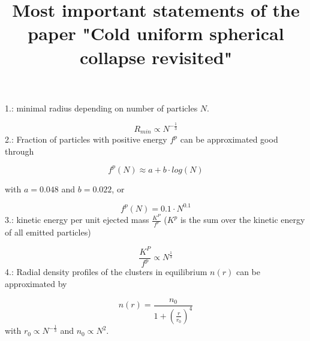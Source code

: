 \documentclass[10pt,a4paper]{article}
\title{Most important statements of the paper "Cold uniform spherical collapse revisited"}
\begin{document}
\maketitle
\newpage

\section{}


1.: minimal radius depending on number of particles $N$.

\begin{equation}
	R_{min} \propto N^{-\frac{1}{3}}
\end{equation}
2.: Fraction of particles with positive energy $f^p$ can be approximated good through

\begin{equation}
	f^p(N) \approx a + b \cdot log(N)
\end{equation}

with $a = 0.048$ and $b = 0.022$, or

\begin{equation}
	f^p(N) = 0.1 \cdot N^{0.1}
\end{equation}
3.: kinetic energy per unit ejected mass $\frac{K^P}{f^p}$ ($K^p$ is the sum over the kinetic energy of all emitted particles)

\begin{equation}
	\frac{K^P}{f^p} \propto N^{\frac{1}{3}}
\end{equation}
4.: Radial density profiles of the clusters in equilibrium $n(r)$ can be approximated by 

\begin{equation}
	n(r) = \frac{n_0}{1+(\frac{r}{r_0})^4}
\end{equation} 
with $r_0 \propto N^{-\frac{1}{3}}$ and $n_0 \propto N^2$.
\end{document}
